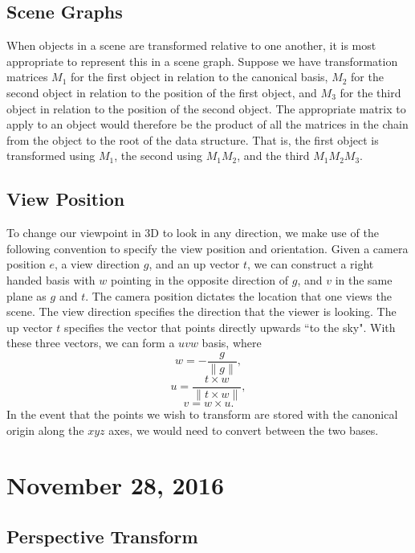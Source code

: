 \documentclass[11pt]{article}
\theoremstyle{plain} %
\theoremstyle{definition}
\theoremstyle{example}
\theoremstyle{remark}
\begin{document}
\subsection{Scene Graphs}

When objects in a scene are transformed relative to one another, it is most appropriate to represent this in a scene graph. Suppose we have transformation matrices $M_1$ for the first object in relation to the canonical basis, $M_2$ for the second object in relation to the position of the first object, and $M_3$ for the third object in relation to the position of the second object. The appropriate matrix to apply to an object would therefore be the product of all the matrices in the chain from the object to the root of the data structure. That is, the first object is transformed using $M_1$, the second using $M_1M_2$, and the third $M_1M_2M_3$.

\subsection{View Position}

To change our viewpoint in 3D to look in any direction, we make use of the following convention to specify the view position and orientation. Given a camera position $e$, a view direction $g$, and an up vector $t$, we can construct a right handed basis with $w$ pointing in the opposite direction of $g$, and $v$ in the same plane as $g$ and $t$. The camera position dictates the location that one views the scene. The view direction specifies the direction that the viewer is looking. The up vector $t$ specifies the vector that points directly upwards ``to the sky". With these three vectors, we can form a $uvw$ basis, where
$$w = -\frac{g}{\|g\|},$$
$$u = \frac{t \times w}{\| t\times w\|},$$
$$v = w \times u.$$
In the event that the points we wish to transform are stored with the canonical origin along the $xyz$ axes, we would need to convert between the two bases. 

\section{November 28, 2016}
\subsection{Perspective Transform}
\end{document}
